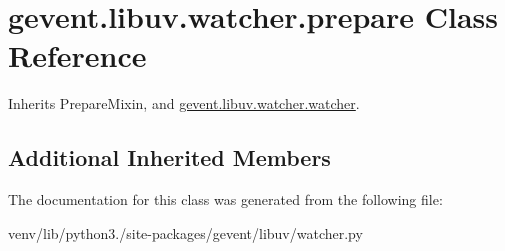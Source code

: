 \hypertarget{classgevent_1_1libuv_1_1watcher_1_1prepare}{}\section{gevent.\+libuv.\+watcher.\+prepare Class Reference}
\label{classgevent_1_1libuv_1_1watcher_1_1prepare}


Inherits Prepare\+Mixin, and \hyperlink{classgevent_1_1libuv_1_1watcher_1_1watcher}{gevent.\+libuv.\+watcher.\+watcher}.

\subsection*{Additional Inherited Members}


The documentation for this class was generated from the following file\+:\begin{DoxyCompactItemize}
\item 
venv/lib/python3./site-\/packages/gevent/libuv/watcher.\+py\end{DoxyCompactItemize}
